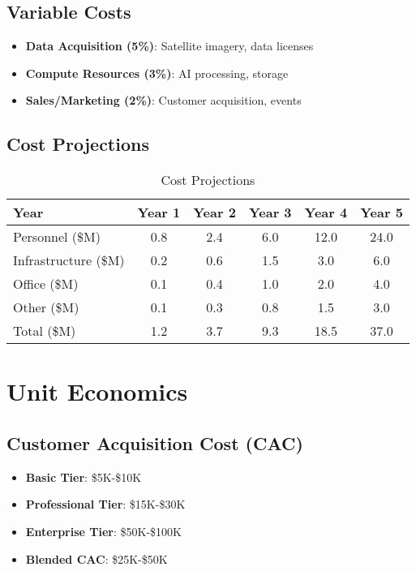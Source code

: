 \documentclass[business]{../templates/infraradar-main}
\begin{document}
\subsection{Variable Costs}
\begin{itemize}
    \item \textbf{Data Acquisition (5\%)}: Satellite imagery, data licenses
    \item \textbf{Compute Resources (3\%)}: AI processing, storage
    \item \textbf{Sales/Marketing (2\%)}: Customer acquisition, events
\end{itemize}

\subsection{Cost Projections}
\begin{table}[h]
\centering
\begin{tabular}{|l|c|c|c|c|c|}
\hline
\textbf{Year} & \textbf{Year 1} & \textbf{Year 2} & \textbf{Year 3} & \textbf{Year 4} & \textbf{Year 5} \\
\hline
Personnel (\$M) & 0.8 & 2.4 & 6.0 & 12.0 & 24.0 \\
\hline
Infrastructure (\$M) & 0.2 & 0.6 & 1.5 & 3.0 & 6.0 \\
\hline
Office (\$M) & 0.1 & 0.4 & 1.0 & 2.0 & 4.0 \\
\hline
Other (\$M) & 0.1 & 0.3 & 0.8 & 1.5 & 3.0 \\
\hline
Total (\$M) & 1.2 & 3.7 & 9.3 & 18.5 & 37.0 \\
\hline
\end{tabular}
\caption{Cost Projections}
\end{table}

\section{Unit Economics}

\subsection{Customer Acquisition Cost (CAC)}
\begin{itemize}
    \item \textbf{Basic Tier}: \$5K-\$10K
    \item \textbf{Professional Tier}: \$15K-\$30K
    \item \textbf{Enterprise Tier}: \$50K-\$100K
    \item \textbf{Blended CAC}: \$25K-\$50K
\end{itemize}
\end{document}
